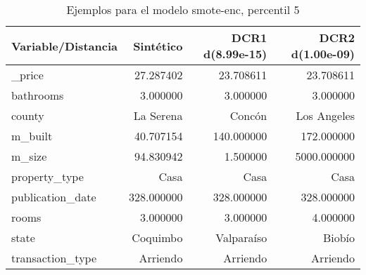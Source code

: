 \begin{table}[H]
\centering
\fontsize{10}{14}\selectfont
\caption{Ejemplos para el modelo smote-enc, percentil 5}
\label{table-example-economicos-b-1-smote-enc-5p}
\begin{tabular}{|l|r|r|r|}
\hline
\rowcolor[gray]{0.8}
Variable/Distancia & Sintético & DCR1 d(8.99e-15) & DCR2 d(1.00e-09) \\
\hline \_price & \cellcolor[rgb]{0.9, 0.54, 0.52} 27.287402 & 23.708611 & 23.708611 \\
\hline bathrooms & \cellcolor[rgb]{0.9, 0.54, 0.52} 3.000000 & \cellcolor[rgb]{0.9, 0.54, 0.52} 3.000000 & \cellcolor[rgb]{0.9, 0.54, 0.52} 3.000000 \\
\hline county & \cellcolor[rgb]{0.9, 0.54, 0.52} La Serena & Concón & Los Angeles \\
\hline m\_built & \cellcolor[rgb]{0.9, 0.54, 0.52} 40.707154 & 140.000000 & 172.000000 \\
\hline m\_size & \cellcolor[rgb]{0.9, 0.54, 0.52} 94.830942 & 1.500000 & 5000.000000 \\
\hline property\_type & \cellcolor[rgb]{0.9, 0.54, 0.52} Casa & \cellcolor[rgb]{0.9, 0.54, 0.52} Casa & \cellcolor[rgb]{0.9, 0.54, 0.52} Casa \\
\hline publication\_date & \cellcolor[rgb]{0.9, 0.54, 0.52} 328.000000 & \cellcolor[rgb]{0.9, 0.54, 0.52} 328.000000 & \cellcolor[rgb]{0.9, 0.54, 0.52} 328.000000 \\
\hline rooms & \cellcolor[rgb]{0.9, 0.54, 0.52} 3.000000 & \cellcolor[rgb]{0.9, 0.54, 0.52} 3.000000 & 4.000000 \\
\hline state & \cellcolor[rgb]{0.9, 0.54, 0.52} Coquimbo & Valparaíso & Biobío \\
\hline transaction\_type & \cellcolor[rgb]{0.9, 0.54, 0.52} Arriendo & \cellcolor[rgb]{0.9, 0.54, 0.52} Arriendo & \cellcolor[rgb]{0.9, 0.54, 0.52} Arriendo \\
\hline
\end{tabular}
\end{table}
